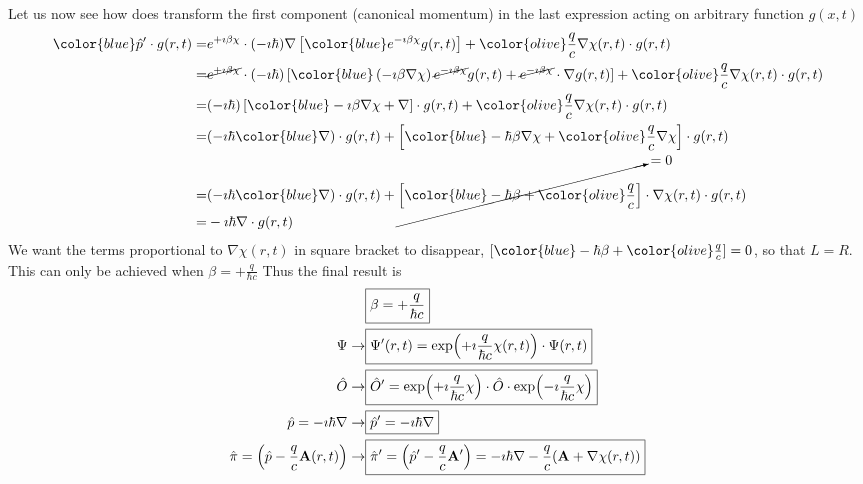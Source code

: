 \documentclass[11pt]{article}
\begin{document}
Let us  now see how does transform the first component  (canonical momentum) in the last expression acting on arbitrary function $g(x,t)$
\begin{align*}
    {\color{blue} \hat p'} \cdot g(r,t) =& 
    e^{+\imath \beta \chi} \cdot (-\imath \hbar) \nabla \left[ \color{blue} e^{- \imath \beta \chi}  g(r,t)   \right]  + {\color{olive} \frac{q}{c} \nabla \chi(r,t) } \cdot g(r,t)\\
    =&   \cancel{e^{+\imath \beta \chi}}  \cdot (-\imath \hbar) \left[\color{blue} \left(-\imath \beta \nabla \chi \right) \cancel{ e^{- \imath \beta \chi}} g(r,t)    + \cancel {e^{- \imath \beta \chi} }\cdot  \nabla g(r,t)  \right]  + {\color{olive} \frac{q}{c} \nabla \chi(r,t) } \cdot g(r,t)\\
    =& (-\imath \hbar) \left[\color{blue}  -\imath \beta \nabla \chi  + \nabla \right] \cdot g(r,t) + {\color{olive} \frac{q}{c} \nabla \chi(r,t) } \cdot g(r,t)\\
    =& (-\imath \hbar {\color{blue} \nabla }) \cdot  g(r,t) + \left[ {\color{blue} -\hbar \beta \nabla \chi }   +{\color{olive} \frac{q}{c} \nabla \chi }\right] \cdot g(r,t) \\
    =& (-\imath \hbar {\color{blue} \nabla }) \cdot  g(r,t) + 
    \cancelto{=0}{\left[ {\color{blue} -\hbar \beta }   +{\color{olive} \frac{q}{c} }\right] } 
    \cdot \nabla \chi(r,t) \cdot g(r,t) \\
    =& -\imath \hbar \nabla \cdot g(r,t) 
\end{align*}
We want the terms proportional to $\nabla \chi(r,t)$  in square bracket to disappear, $[{\color{blue}-\hbar \beta} + {\color{olive}\frac{q}{c}}] =0$, so that $L=R$. This can only be achieved when $\beta= +\frac{q}{\hbar c}$
Thus the final result is
\begin{align}
&\boxed{\beta= +\frac{q}{\hbar c}} \nonumber \\
\label{eq:gauge_rule_psi}
    \Psi\to &\boxed{ \Psi'(r,t)=  \exp( +\imath \frac{q}{\hbar c}  \chi(r,t) )\cdot \Psi(r,t)    } \\
\label{eq:gauge_rule_Operator}
    \hat O \to & \boxed{\hat O' = \exp( +\imath \frac{q}{\hbar c} \chi )\cdot \hat O \cdot \exp( -\imath \frac{q}{\hbar c}  \chi )}\\
\label{eq:gauge_rule_momentum_canonical}
    \hat p = -\imath \hbar \nabla  \to &\boxed{  \hat p' = -\imath \hbar \nabla  } \\
\label{eq:gauge_rule_momentum_kinetical}
    \hat \pi    = \left( \hat p- \frac{q}{c} \vb A(r,t) \right) \to&  \boxed{ \hat \pi'  =\left( \hat p'  - \frac{q}{c} \vb A' \right) = -\imath \hbar \nabla - \frac{q}{c} (\vb A + \nabla \chi(r,t) )}
\end{align}
\end{document}
